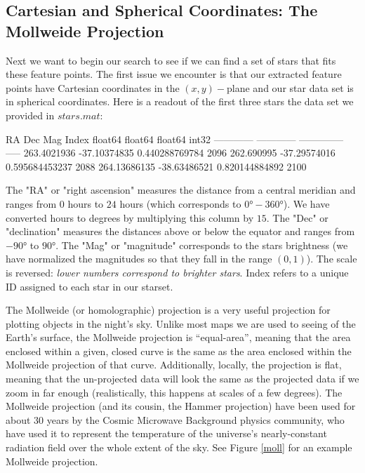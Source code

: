 \documentclass[paper=a4, fontsize=11pt]{scrartcl} %
\begin{document}
\subsection{Cartesian and Spherical Coordinates: The Mollweide Projection}
Next we want to begin our search to see if we can find a set of stars that fits these feature points. The first issue we encounter is that our extracted feature points have Cartesian coordinates in the $(x,y)-$plane and our star data set is in spherical coordinates. Here is a readout of the first three stars the data set we provided in $stars.mat$:
\begin{python}
	     RA          Dec           Mag       Index
	  float64      float64       float64     int32
	------------ ------------ -------------- -----
	 263.4021936 -37.10374835 0.440288769784  2096
	  262.690995 -37.29574016 0.595684453237  2088
	264.13686135 -38.63486521 0.820144884892  2100
\end{python}
The "RA" or "right ascension" measures the distance from a central meridian and ranges from $0$ hours to $24$ hours (which corresponds to $0\si{\degree}-360\si{\degree}$). We have converted hours to degrees by multiplying this column by $15$.
The "Dec" or "declination" measures the distances above or below the equator and ranges from $-90\si{\degree}$ to $90\si{\degree}$. The "Mag" or "magnitude" corresponds to the stars brightness (we have normalized the magnitudes so that they fall in the range $(0,1)$). The scale is reversed: \textit{lower numbers correspond to brighter stars}.
Index refers to a unique ID assigned to each star in our starset.

The Mollweide (or homolographic) projection is a very useful projection for plotting objects in the night’s sky. Unlike most maps we are used to seeing of the Earth’s surface, the Mollweide projection is ``equal-area”, meaning that the area enclosed within a given, closed curve is the same as the area enclosed within the Mollweide projection of that curve. Additionally, locally, the projection is flat, meaning that the un-projected data will look the same as the projected data if we zoom in far enough (realistically, this happens at scales of a few degrees). The Mollweide projection (and its cousin, the Hammer projection) have been used for about 30 years by the Cosmic Microwave Background physics community, who have used it to represent the temperature of the universe’s nearly-constant radiation field over the whole extent of the sky.  See Figure \ref{moll} for an example Mollweide projection.
\end{document}
